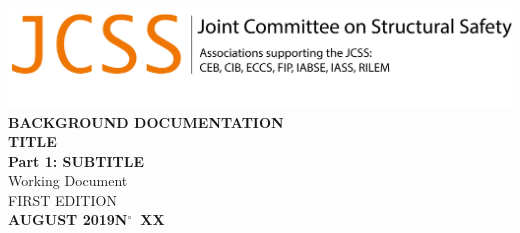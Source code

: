 

\includegraphics[width=\textwidth]{JCSS_logo_long.png}\\[10pc]


\noindent\LARGE{\textbf{\MakeUppercase{Background documentation}}}\\
\noindent\LARGE{\textbf{TITLE}}\\
\noindent\LARGE{\textbf{Part 1: \MakeUppercase{SUBTITLE}}}\\[10pc]

\normalsize\vfill\noindent Working Document\\[5pc]

\noindent\MakeUppercase{First edition}\\[2pc]

\noindent\textbf{\large{{\MakeUppercase{August 2019\hfill N$^\circ$~XX}}}}









